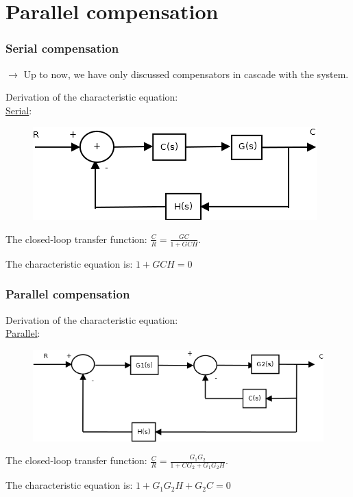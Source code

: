 \section{Parallel compensation}

\begin{frame}
	\frametitle{Serial compensation}
	$\rightarrow$ Up to now, we have only discussed compensators in cascade with the system. \vspace{4mm}
	
	Derivation of the characteristic equation:\\
	\underline{Serial}:
	\begin{figure}
		\centering
		\includegraphics[width=0.7\linewidth]{Serial_compensator}
	\end{figure}
	The closed-loop transfer function: $\frac{C}{R}=\frac{GC}{1+GCH}$.\vspace{3mm}
	
	The characteristic equation is: $1+GCH=0$
\end{frame}

\begin{frame}
	\frametitle{Parallel compensation}
	Derivation of the characteristic equation:\\
	\underline{Parallel}:
	\begin{figure}
		\centering
		\includegraphics[width=0.9\linewidth]{Parallel_compensator}
	\end{figure}
	The closed-loop transfer function: $\frac{C}{R}=\frac{G_1G_2}{1+CG_2+G_1G_2H}$.\vspace{3mm}
	
	The characteristic equation is: $1+G_1G_2H+G_2C=0$
\end{frame}

